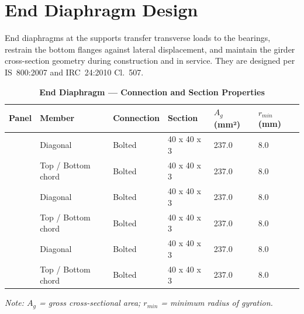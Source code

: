 \section{End Diaphragm Design}
\label{sec:end-diaphragm}

End diaphragms at the supports transfer transverse loads to the bearings, restrain the bottom flanges against lateral displacement, and maintain the girder cross-section geometry during construction and in service. They are designed per IS~800:2007 and IRC~24:2010 Cl.~507.

\vspace{1em}

\vspace{0.4em}
\noindent
\setlength{\tabcolsep}{4pt}
\setlength{\LTleft}{0pt}
\setlength{\LTright}{\fill}

\begin{longtable}{|C{2.0cm}|L{2.0cm}|L{2.2cm}|C{2.5cm}|C{2.0cm}|C{2.0cm}|}
\caption{\textbf{End Diaphragm --- Connection and Section Properties}}
\hline
\textbf{Panel} & \textbf{Member} & \textbf{Connection} & \textbf{Section} & \textbf{$A_g$ (mm²)} & \textbf{$r_{min}$ (mm)} \\[6pt]
\hline
{} & Diagonal & Bolted & 40 x 40 x 3 & 237.0 & 8.0 \\[6pt]
 & Top / Bottom chord & Bolted & 40 x 40 x 3 & 237.0 & 8.0 \\[6pt]
\hline
{} & Diagonal & Bolted & 40 x 40 x 3 & 237.0 & 8.0 \\[6pt]
 & Top / Bottom chord & Bolted & 40 x 40 x 3 & 237.0 & 8.0 \\[6pt]
\hline
{} & Diagonal & Bolted & 40 x 40 x 3 & 237.0 & 8.0 \\[6pt]
 & Top / Bottom chord & Bolted & 40 x 40 x 3 & 237.0 & 8.0 \\[6pt]
\hline
\end{longtable}
\noindent\textit{Note: $A_g$ = gross cross-sectional area; $r_{min}$ = minimum radius of gyration.}

